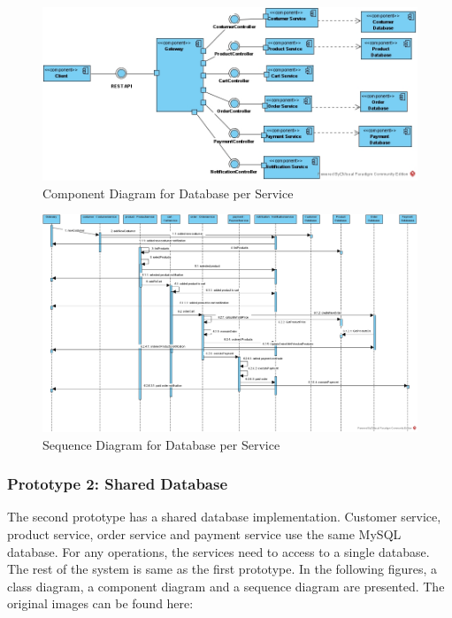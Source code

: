 \documentclass{article}
\begin{document}
\pagebreak


\begin{figure}[h!]
\centering
\includegraphics[scale=0.55, angle=90]{Comp_Microservice.jpg}
\caption{Component Diagram for Database per Service}
\label{fig:comp_DB}
\end{figure}

\pagebreak

\begin{figure}[h!]
\centering
\includegraphics[scale=0.32, angle=90]{Sequence_DB.jpg}
\caption{Sequence Diagram for Database per Service}
\label{fig:seq_DB}
\end{figure}

\pagebreak


\subsubsection{Prototype 2: Shared Database}

The second prototype has a shared database implementation. Customer service, product service, order service and payment service use the same MySQL database. For any operations, the services need to access to a  single database. The rest of the system is same as the first prototype. In the following figures, a class diagram, a component diagram and a sequence diagram are presented. The original images can be found here: 
\end{document}
